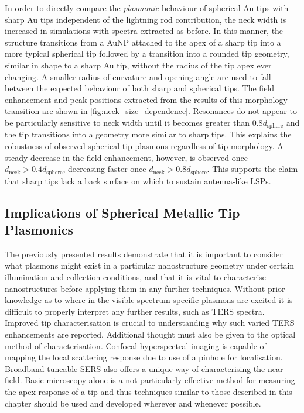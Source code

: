 \documentclass{article}
\begin{document}
In order to directly compare the \emph{plasmonic} behaviour of spherical Au tips with sharp Au tips independent of the lightning rod contribution, the neck width is increased in simulations with spectra extracted as before. In this manner, the structure transitions from a AuNP attached to the apex of a sharp tip into a more typical spherical tip followed by a transition into a rounded tip geometry, similar in shape to a sharp Au tip, without the radius of the tip apex ever changing.
{\color{red}A smaller radius of curvature and opening angle are used to fall between the expected behaviour of both sharp and spherical tips.}
The field enhancement and peak positions extracted from the results of this morphology transition are shown in \autoref{fig:neck_size_dependence}. Resonances do not appear to be particularly sensitive to neck width until it becomes greater than $0.8d_{\mathrm{sphere}}$ and the tip transitions into a geometry more similar to sharp tips. This explains the robustness of observed spherical tip plasmons regardless of tip morphology. A steady decrease in the field enhancement, however, is observed once $d_{\mathrm{neck}}>0.4d_{\mathrm{sphere}}$, decreasing faster once $d_{\mathrm{neck}}>0.8d_{\mathrm{sphere}}$. This supports the claim that sharp tips lack a back surface on which to sustain antenna-like LSPs.

\subsection{Implications of Spherical Metallic Tip Plasmonics}

The previously presented results demonstrate that it is important to consider what plasmons might exist in a particular nanostructure geometry under certain illumination and collection conditions, and that it is vital to characterise nanostructures before applying them in any further techniques. Without prior knowledge as to where in the visible spectrum specific plasmons are excited it is difficult to properly interpret any further results, such as TERS spectra. Improved tip characterisation is crucial to understanding why such varied TERS enhancements are reported. Additional thought must also be given to the optical method of characterisation. Confocal hyperspectral imaging is capable of mapping the local scattering response due to use of a pinhole for localisation. Broadband tuneable SERS also offers a unique way of characterising the near-field. Basic microscopy alone is a not particularly effective method for measuring the apex response of a tip and thus techniques similar to those described in this chapter should be used and developed wherever and whenever possible.
\end{document}
